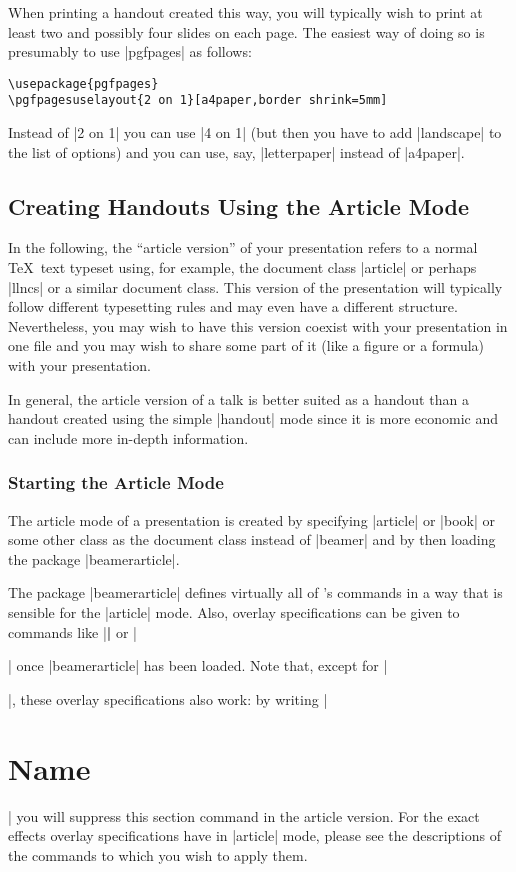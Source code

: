 When printing a handout created this way, you will typically wish to print at least two and possibly four slides on each page. The easiest way of doing so is presumably to use |pgfpages| as follows:

\begin{verbatim}
\usepackage{pgfpages}
\pgfpagesuselayout{2 on 1}[a4paper,border shrink=5mm]
\end{verbatim}

Instead of |2 on 1| you can use |4 on 1| (but then you have to add |landscape| to the list of options) and you can use, say, |letterpaper| instead of |a4paper|.


\subsection{Creating Handouts Using the Article Mode}
\label{section-article}

In the following, the ``article version'' of your presentation refers to a normal \TeX\ text typeset using, for example, the document class |article| or perhaps |llncs| or a similar document class. This version of the presentation will typically follow different typesetting rules and may even have a different structure. Nevertheless, you may wish to have this version coexist with your presentation in one file and you may wish to share some part of it (like a figure or a formula) with your presentation.

In general, the article version of a talk is better suited as a handout than a handout created using the simple |handout| mode since it is more economic and can include more in-depth information.

\subsubsection{Starting the Article Mode}

The article mode of a presentation is created by specifying |article| or |book| or some other class as the document class instead of |beamer| and by then loading the package |beamerarticle|.

The package |beamerarticle| defines virtually all of \beamer's commands in a way that is sensible for the |article| mode. Also, overlay specifications can be given to commands like |\textbf| or |\item| once |beamerarticle| has been loaded. Note that, except for |\item|, these overlay specifications also work: by writing |\section<presentation>{Name}| you will suppress this section command in the article version. For the exact effects overlay specifications have in |article| mode, please see the descriptions of the commands to which you wish to apply them.

